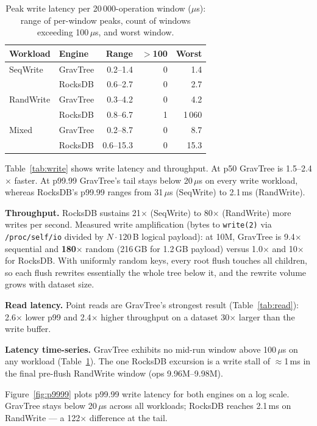 \documentclass{jors}
\begin{document}
\begin{table}[t]
\centering
\footnotesize
\caption{Peak write latency per 20\,000-operation window ($\mu$s):
range of per-window peaks, count of windows exceeding 100\,$\mu$s,
and worst window.}
\label{tab:timeseries}
\setlength{\tabcolsep}{3pt}
\begin{tabular}{llrrr}
\toprule
Workload & Engine & Range & $>$100 & Worst \\
\midrule
SeqWrite  & GravTree & 0.2--1.4  & 0 & 1.4 \\
          & RocksDB  & 0.6--2.7  & 0 & 2.7 \\
RandWrite & GravTree & 0.3--4.2  & 0 & 4.2 \\
          & RocksDB  & 0.8--6.7  & 1 & 1\,060 \\
Mixed     & GravTree & 0.2--8.7  & 0 & 8.7 \\
          & RocksDB  & 0.6--15.3 & 0 & 15.3 \\
\bottomrule
\end{tabular}
\end{table}

Table~\ref{tab:write} shows write latency and throughput. At p50
GravTree is 1.5--2.4$\times$ faster. At p99.99 GravTree's tail stays
below 20\,$\mu$s on every write workload, whereas RocksDB's p99.99
ranges from 31\,$\mu$s (SeqWrite) to 2.1\,ms (RandWrite).

\textbf{Throughput.} RocksDB sustains 21$\times$ (SeqWrite) to
80$\times$ (RandWrite) more writes per second. Measured write
amplification (bytes to \texttt{write(2)} via \texttt{/proc/self/io}
divided by $N \cdot 120$\,B logical payload): at 10M, GravTree is
9.4$\times$ sequential and \textbf{180$\times$} random (216\,GB for
1.2\,GB payload) versus 1.0$\times$ and 10$\times$ for RocksDB. With
uniformly random keys, every root flush touches all children, so each
flush rewrites essentially the whole tree below it, and the rewrite
volume grows with dataset size.

\textbf{Read latency.} Point reads are GravTree's strongest result
(Table~\ref{tab:read}): 2.6$\times$ lower p99 and 2.4$\times$ higher
throughput on a dataset 30$\times$ larger than the write buffer.

\textbf{Latency time-series.} GravTree exhibits no mid-run window above
100\,$\mu$s on any workload (Table~\ref{tab:timeseries}). The one
RocksDB excursion is a write stall of $\approx$1\,ms in the final
pre-flush RandWrite window (ops 9.96M--9.98M).

Figure~\ref{fig:p9999} plots p99.99 write latency for both engines on a
log scale. GravTree stays below 20\,$\mu$s across all workloads; RocksDB
reaches 2.1\,ms on RandWrite — a 122$\times$ difference at the tail.
\end{document}
